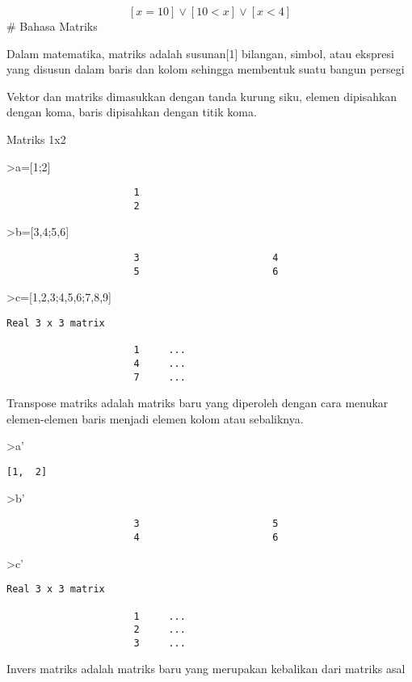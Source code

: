\documentclass[
]{book}
\begin{document}
\[\left[ x=10 \right] \lor \left[ 10<x \right] \lor \left[ x<4
  \right] \]\# Bahasa Matriks

Dalam matematika, matriks adalah susunan{[}1{]} bilangan, simbol, atau ekspresi yang disusun dalam baris dan kolom sehingga membentuk suatu bangun persegi

Vektor dan matriks dimasukkan dengan tanda kurung siku, elemen dipisahkan dengan koma, baris dipisahkan dengan titik koma.

Matriks 1x2

\textgreater a={[}1;2{]}

\begin{verbatim}
                      1 
                      2 
\end{verbatim}

\textgreater b={[}3,4;5,6{]}

\begin{verbatim}
                      3                       4 
                      5                       6 
\end{verbatim}

\textgreater c={[}1,2,3;4,5,6;7,8,9{]}

\begin{verbatim}
Real 3 x 3 matrix

                      1     ...
                      4     ...
                      7     ...
\end{verbatim}

Transpose matriks adalah matriks baru yang diperoleh dengan cara menukar elemen-elemen baris menjadi elemen kolom atau sebaliknya.

\textgreater a'

\begin{verbatim}
[1,  2]
\end{verbatim}

\textgreater b'

\begin{verbatim}
                      3                       5 
                      4                       6 
\end{verbatim}

\textgreater c'

\begin{verbatim}
Real 3 x 3 matrix

                      1     ...
                      2     ...
                      3     ...
\end{verbatim}

Invers matriks adalah matriks baru yang merupakan kebalikan dari matriks asal
\end{document}
